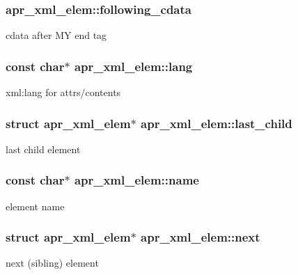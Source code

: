 \subsubsection[{\texorpdfstring{following\+\_\+cdata}{following_cdata}}]{ apr\+\_\+xml\+\_\+elem\+::following\+\_\+cdata}\hypertarget{structapr__xml__elem_a8d64c5343354e34c1cc7ac67f51cc89a}{}\label{structapr__xml__elem_a8d64c5343354e34c1cc7ac67f51cc89a}
cdata after MY end tag 
\subsubsection[{\texorpdfstring{lang}{lang}}]{\setlength{\rightskip}{0pt plus 5cm}const char$\ast$ apr\+\_\+xml\+\_\+elem\+::lang}\hypertarget{structapr__xml__elem_a9a48a384f579816f62a7369aeb8b1a0c}{}\label{structapr__xml__elem_a9a48a384f579816f62a7369aeb8b1a0c}
xml\+:lang for attrs/contents 
\subsubsection[{\texorpdfstring{last\+\_\+child}{last_child}}]{\setlength{\rightskip}{0pt plus 5cm}struct {\bf apr\+\_\+xml\+\_\+elem}$\ast$ apr\+\_\+xml\+\_\+elem\+::last\+\_\+child}\hypertarget{structapr__xml__elem_ad4f49811fc36f2377c72ac2c19e57abd}{}\label{structapr__xml__elem_ad4f49811fc36f2377c72ac2c19e57abd}
last child element 
\subsubsection[{\texorpdfstring{name}{name}}]{\setlength{\rightskip}{0pt plus 5cm}const char$\ast$ apr\+\_\+xml\+\_\+elem\+::name}\hypertarget{structapr__xml__elem_a5b2fb684a9cfb244f88ad88f539fe3d6}{}\label{structapr__xml__elem_a5b2fb684a9cfb244f88ad88f539fe3d6}
element name 
\subsubsection[{\texorpdfstring{next}{next}}]{\setlength{\rightskip}{0pt plus 5cm}struct {\bf apr\+\_\+xml\+\_\+elem}$\ast$ apr\+\_\+xml\+\_\+elem\+::next}\hypertarget{structapr__xml__elem_a8687253d504b1c1363c47117611042ac}{}\label{structapr__xml__elem_a8687253d504b1c1363c47117611042ac}
next (sibling) element 
